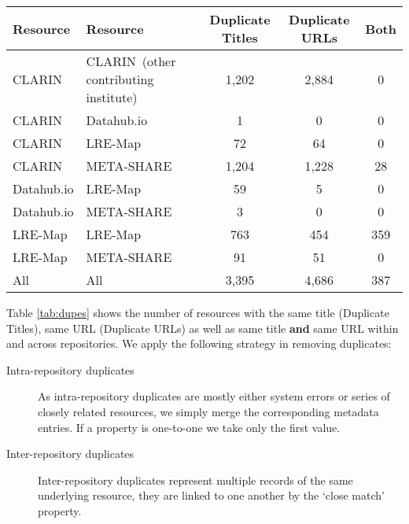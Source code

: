 \documentclass[11pt]{article}
\begin{document}
\begin{table*}
    \begin{center}
        \begin{tabular}{ll|ccc}
        Resource    & Resource    & Duplicate Titles & Duplicate URLs & Both \\
        \hline                                                                  
        CLARIN      & CLARIN{\tiny~(other contributing institute)}      & 1,202            & 2,884          & 0    \\
        CLARIN      & Datahub.io  & 1                & 0              & 0    \\
        CLARIN      & LRE-Map     & 72               & 64             & 0    \\
        CLARIN      & META-SHARE  & 1,204            & 1,228          & 28    \\
        Datahub.io  & LRE-Map     & 59               & 5              & 0    \\
        Datahub.io  & META-SHARE  & 3                & 0              & 0    \\
        LRE-Map     & LRE-Map     & 763              & 454            & 359  \\
        LRE-Map     & META-SHARE  & 91               & 51             & 0    \\
        \hline
        All         & All         & 3,395            & 4,686          & 387  \\
        \end{tabular}
    \end{center}
    \caption{\label{tab:dupes}Number of duplicate inter-repository records by type}
\end{table*}

Table \ref{tab:dupes} shows the number of resources with the same title (Duplicate Titles), same URL (Duplicate URLs) as well as same title \textbf{and} same URL within and across repositories. 
We apply the following strategy in removing duplicates:

\begin{description}
    \item[Intra-repository duplicates] As intra-repository duplicates are
        mostly either system errors or series of closely related resources, we
        simply merge the corresponding metadata entries. If a property is one-to-one we take only the
        first value.
    \item[Inter-repository duplicates] Inter-repository duplicates represent
        multiple records of the same underlying resource, they are linked to one
        another by the `close match' property.
\end{description}
\end{document}
